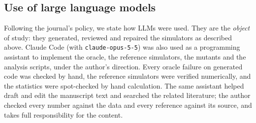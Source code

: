 \subsection{Use of large language models}
Following the journal's policy, we state how LLMs were used. They are the \emph{object} of study: they generated, reviewed and repaired the simulators as described above. Claude Code (with \texttt{claude-opus-5-5}) was also used as a programming assistant to implement the oracle, the reference simulators, the mutants and the analysis scripts, under the author's direction. Every oracle failure on generated code was checked by hand, the reference simulators were verified numerically, and the statistics were spot-checked by hand calculation. The same assistant helped draft and edit the manuscript text and searched the related literature; the author checked every number against the data and every reference against its source, and takes full responsibility for the content.
